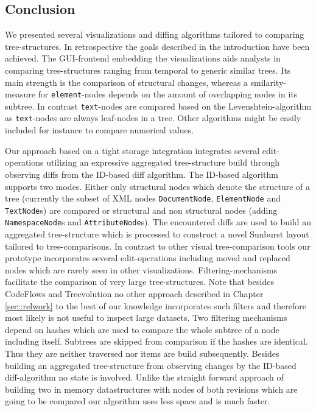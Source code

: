 \subsection{Conclusion}
We presented several visualizations and diffing algorithms tailored to comparing tree-structures. In retrospective the goals described in the introduction have been achieved. The GUI-frontend embedding the visualizations aids analysts in comparing tree-structures ranging from temporal to generic similar trees. Its main strength is the comparison of structural changes, whereas a smilarity-measure for \texttt{element}-nodes depends on the amount of overlapping nodes in its subtree. In contrast \texttt{text}-nodes are compared based on the Levenshtein-algorithm as \texttt{text}-nodes are always leaf-nodes in a tree. Other algorithms might be easily included for instance to compare numerical values.

Our approach based on a tight storage integration integrates several edit-operations utilizing an expressive aggregated tree-structure build through observing diffs from the ID-based diff algorithm. The ID-based algorithm supports two modes. Either only structural nodes which denote the structure of a tree (currently the subset of XML nodes \texttt{DocumentNode}, \texttt{ElementNode} and \texttt{TextNode}s) are compared or structural and non structural nodes (adding \texttt{NamespaceNode}s and \texttt{AttributeNode}s). The encountered diffs are used to build an aggregated tree-structure which is processed to construct a novel Sunburst layout tailored to tree-comparisons. In contrast to other visual tree-comparison tools our prototype incorporates several edit-operations including moved and replaced nodes which are rarely seen in other visualizations. Filtering-mechanisms facilitate the comparison of very large tree-structures. Note that besides CodeFlows\cite{} and Treevolution\cite{theron2006hierarchical} no other approach described in Chapter \ref{sec::relwork} to the best of our knowledge incorporates such filters and therefore most likely is not useful to inspect large datasets. Two filtering mechanisms depend on hashes which are used to compare the whole subtree of a node including itself. Subtrees are skipped from comparison if the hashes are identical. Thus they are neither traversed nor items are build subsequently. Besides building an aggregated tree-structure from observing changes by the ID-based diff-algorithm no state is involved. Unlike the straight forward approach of building two in memory datastructures with nodes of both revisions which are going to be compared our algorithm uses less space and is much faster. 

